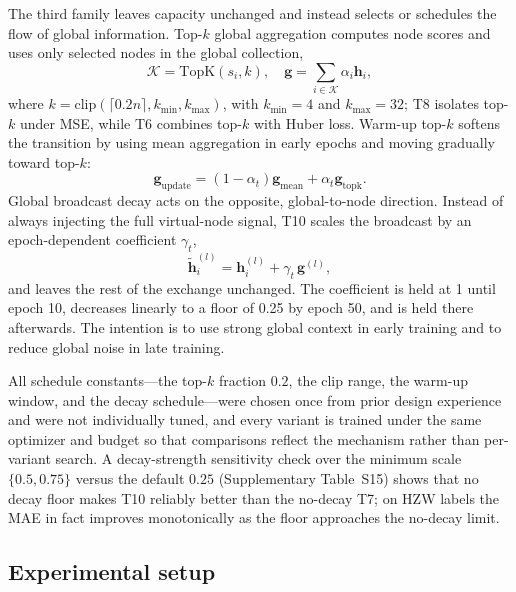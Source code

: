 \documentclass[a4paper,11pt]{article}
\begin{document}
The third family leaves capacity unchanged and instead selects or schedules the flow of global information. Top-\(k\) global aggregation computes node scores and uses only selected nodes in the global collection,
\begin{equation}
\mathcal{K}=\mathrm{TopK}(s_i,k),\quad
\mathbf{g}=\sum_{i\in\mathcal{K}}\alpha_i\mathbf{h}_i,
\end{equation}
where \(k=\mathrm{clip}(\lceil0.2n\rceil,k_{\min},k_{\max})\), with \(k_{\min}=4\) and \(k_{\max}=32\); T8 isolates top-\(k\) under MSE, while T6 combines top-\(k\) with Huber loss. Warm-up top-\(k\) softens the transition by using mean aggregation in early epochs and moving gradually toward top-\(k\):
\begin{equation}
\mathbf{g}_{\mathrm{update}} =
(1-\alpha_t)\mathbf{g}_{\mathrm{mean}}
+ \alpha_t\mathbf{g}_{\mathrm{topk}}.
\end{equation}
Global broadcast decay acts on the opposite, global-to-node direction. Instead of always injecting the full virtual-node signal, T10 scales the broadcast by an epoch-dependent coefficient \(\gamma_t\),
\begin{equation}
\tilde{\mathbf{h}}^{(l)}_i =
\mathbf{h}^{(l)}_i + \gamma_t\,\mathbf{g}^{(l)},
\end{equation}
and leaves the rest of the exchange unchanged. The coefficient is held at 1 until epoch 10, decreases linearly to a floor of 0.25 by epoch 50, and is held there afterwards. The intention is to use strong global context in early training and to reduce global noise in late training.

All schedule constants---the top-\(k\) fraction \(0.2\), the clip range, the warm-up window, and the decay schedule---were chosen once from prior design experience and were not individually tuned, and every variant is trained under the same optimizer and budget so that comparisons reflect the mechanism rather than per-variant search. A decay-strength sensitivity check over the minimum scale \(\{0.5,0.75\}\) versus the default \(0.25\) (Supplementary Table~S15) shows that no decay floor makes T10 reliably better than the no-decay T7; on HZW labels the MAE in fact improves monotonically as the floor approaches the no-decay limit.

\subsection{Experimental setup}
\label{sec:setup}
\end{document}
